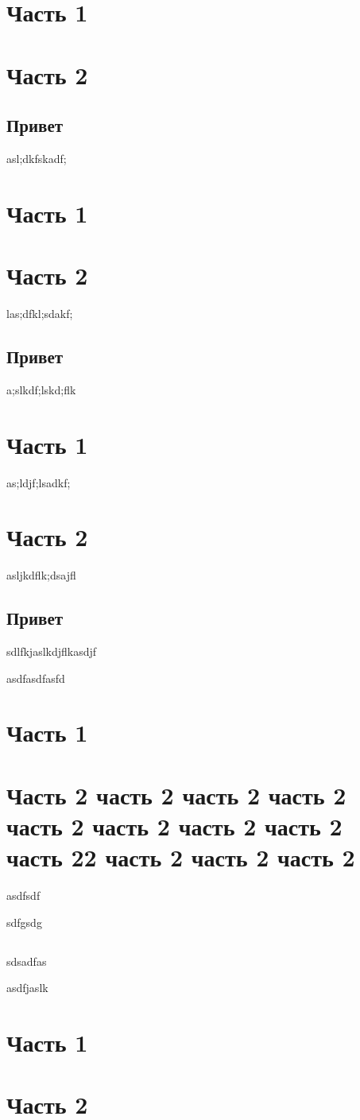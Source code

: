 \documentclass[a4paper,10pt]{article}
\begin{document}
\section{Часть 1}

\section{Часть 2}
\subsection{Привет}
asl;dkfskadf;
\section{Часть 1}

\section{Часть 2}
las;dfkl;sdakf;
\subsection{Привет}
a;slkdf;lskd;flk
\section{Часть 1}
as;ldjf;lsadkf;
\section{Часть 2}
asljkdflk;dsajfl
\subsection{Привет}
\hspace{0pt}
sdlfkjaslkdjflkasdjf

asdfasdfasfd

\section{Часть 1}

\section{Часть 2 часть 2 часть 2 часть 2 часть 2 часть 2 часть 2 часть 2 часть 22 часть 2 часть 2 часть 2}
asdfsdf

sdfgsdg

\subsection{\lipsum[1]}

sdsadfas

asdfjaslk

\section{Часть 1}

\lipsum[6-20]

\section{Часть 2}

\label{lastpage}
\end{document}
